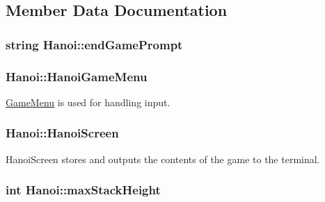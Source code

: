 \subsection{Member Data Documentation}
\hypertarget{classHanoi_a43513810a88b1c43a61dc26838ce6446}{
\subsubsection[{end\-Game\-Prompt}]{\setlength{\rightskip}{0pt plus 5cm}string Hanoi\-::end\-Game\-Prompt\hspace{0.3cm}{\ttfamily [private]}}}\label{classHanoi_a43513810a88b1c43a61dc26838ce6446}
\hypertarget{classHanoi_a7d73005d59c4f2134ffd564964ab3f49}{
\subsubsection[{Hanoi\-Game\-Menu}]{ Hanoi\-::\-Hanoi\-Game\-Menu\hspace{0.3cm}{\ttfamily [private]}}}\label{classHanoi_a7d73005d59c4f2134ffd564964ab3f49}


\hyperlink{classGameMenu}{Game\-Menu} is used for handling input. 

\hypertarget{classHanoi_a1b9bfd6a0428f772d78b66a5a3268c4c}{
\subsubsection[{Hanoi\-Screen}]{ Hanoi\-::\-Hanoi\-Screen\hspace{0.3cm}{\ttfamily [private]}}}\label{classHanoi_a1b9bfd6a0428f772d78b66a5a3268c4c}


Hanoi\-Screen stores and outputs the contents of the game to the terminal. 

\hypertarget{classHanoi_a826f3bc786cb5c7b6499508d0b8bc9b4}{
\subsubsection[{max\-Stack\-Height}]{\setlength{\rightskip}{0pt plus 5cm}int Hanoi\-::max\-Stack\-Height\hspace{0.3cm}{\ttfamily [private]}}}\label{classHanoi_a826f3bc786cb5c7b6499508d0b8bc9b4}


